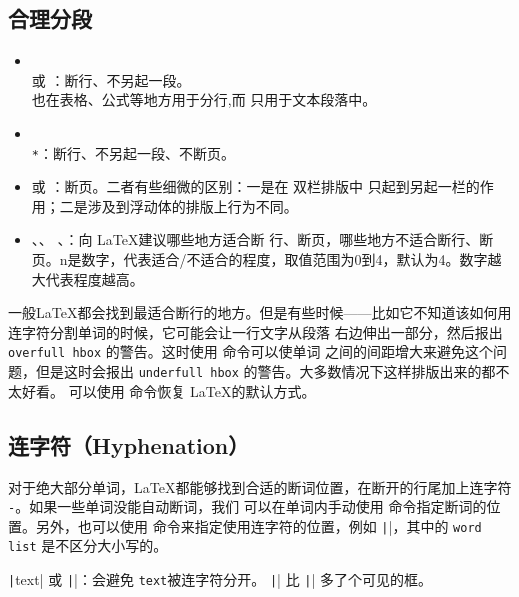\documentclass[UTF8]{ctexart}
\begin{document}
\subsection{合理分段}
\begin{itemize}
    \item \texttt{\\} 或 \texttt{\newline}：断行、不另起一段。
    \texttt{\\} 也在表格、公式等地方用于分行,而 \texttt{\newline} 只用于文本段落中。
    \item \texttt{\\*}：断行、不另起一段、不断页。
    \item \texttt{\newpage} 或 \texttt{\clearpage}：断页。二者有些细微的区别：一是在
    双栏排版中 \texttt{\newpage} 只起到另起一栏的作用；二是涉及到浮动体的排版上行为不同。
    \item \texttt{\linebreak[n]}、\texttt{\nolinebreak[n]}、
    \texttt{\pagebreak[n]}、\texttt{\nopagebreak[n]}：向 \LaTeX 建议哪些地方适合断
    行、断页，哪些地方不适合断行、断页。n是数字，代表适合/不适合的程度，取值范围为0到4，默认为4。数字越大代表程度越高。
\end{itemize}

一般\LaTeX 都会找到最适合断行的地方。但是有些时候——比如它不知道该如何用连字符分割单词的时候，它可能会让一行文字从段落
右边伸出一部分，然后报出 \texttt{overfull hbox} 的警告。这时使用 \texttt{\sloppy} 命令可以使单词
之间的间距增大来避免这个问题，但是这时会报出 \texttt{underfull hbox} 的警告。大多数情况下这样排版出来的都不太好看。
可以使用 \texttt{\fussy} 命令恢复 \LaTeX 的默认方式。

\subsection{连字符（Hyphenation）}
对于绝大部分单词，\LaTeX 都能够找到合适的断词位置，在断开的行尾加上连字符 \texttt{-}。如果一些单词没能自动断词，我们
可以在单词内手动使用 \texttt{\-} 命令指定断词的位置。另外，也可以使用
\texttt{} 命令来指定使用连字符的位置，例如
\texttt||，其中的 \texttt{word list} 是不区分大小写的。

\texttt|\mbox{text}| 或 \texttt||：会避免 \texttt{text}被连字符分开。
\texttt|\fbox| 比 \texttt|\mbox| 多了个可见的框。
\end{document}
